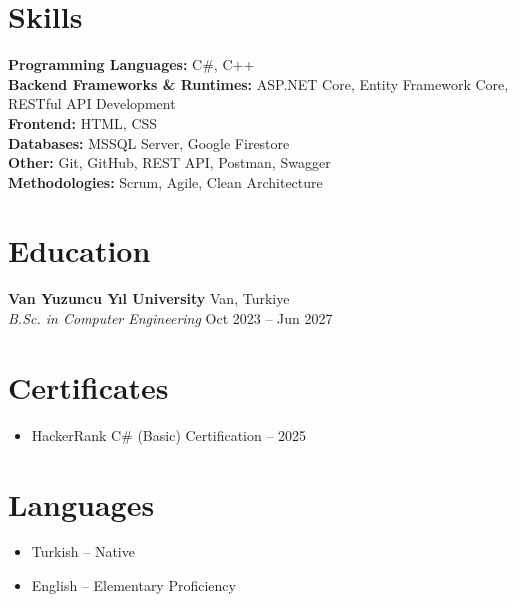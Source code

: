 \documentclass[10pt,a4paper]{extarticle}
\begin{document}
\section{Skills}
\textbf{Programming Languages:} C\#, C++ \\
\textbf{Backend Frameworks \& Runtimes:} ASP.NET Core, Entity Framework Core, RESTful API Development \\
\textbf{Frontend:} HTML, CSS \\
\textbf{Databases:} MSSQL Server, Google Firestore \\
\textbf{Other:} Git, GitHub, REST API, Postman, Swagger \\
\textbf{Methodologies:} Scrum, Agile, Clean Architecture
\section{Education}
\textbf{Van Yuzuncu Yıl University} \hfill Van, Turkiye\\
\textit{B.Sc. in Computer Engineering} \hfill Oct 2023 -- Jun 2027\\
\section{Certificates}
\begin{itemize}[leftmargin=*,noitemsep,topsep=0pt]
    \item HackerRank C\# (Basic) Certification – 2025
\end{itemize}
\section{Languages}
\begin{itemize}[leftmargin=*,noitemsep,topsep=0pt]
    \item Turkish – Native
    \item English – Elementary Proficiency
\end{itemize}
\end{document}
